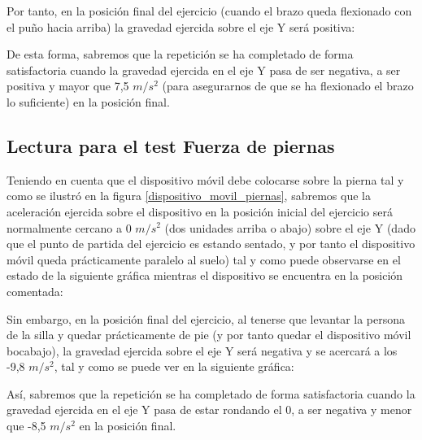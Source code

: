 
Por tanto, en la posición final del ejercicio (cuando el brazo queda flexionado con el puño hacia arriba) la gravedad ejercida sobre el eje Y será positiva:


De esta forma, sabremos que la repetición se ha completado de forma satisfactoria cuando la gravedad ejercida en el eje Y pasa de ser negativa, a ser positiva y mayor que 7,5 $m/s^{2}$ (para asegurarnos de que se ha flexionado el brazo lo suficiente) en la posición final.

\subsection{Lectura para el test Fuerza de piernas}

Teniendo en cuenta que el dispositivo móvil debe colocarse sobre la pierna tal y como se ilustró en la figura \ref{dispositivo_movil_piernas}, sabremos que la aceleración ejercida sobre el dispositivo en la posición inicial del ejercicio será normalmente cercano a 0 $m/s^{2}$ (dos unidades arriba o abajo) sobre el eje Y (dado que el punto de partida del ejercicio es estando sentado, y por tanto el dispositivo móvil queda prácticamente paralelo al suelo) tal y como puede observarse en el estado de la siguiente gráfica mientras el dispositivo se encuentra en la posición comentada:


Sin embargo, en la posición final del ejercicio, al tenerse que levantar la persona de la silla y quedar prácticamente de pie (y por tanto quedar el dispositivo móvil bocabajo), la gravedad ejercida sobre el eje Y será negativa y se acercará a los -9,8 $m/s^{2}$, tal y como se puede ver en la siguiente gráfica:


Así, sabremos que la repetición se ha completado de forma satisfactoria cuando la gravedad ejercida en el eje Y pasa de estar rondando el 0, a ser negativa y menor que -8,5 $m/s^{2}$ en la posición final.

